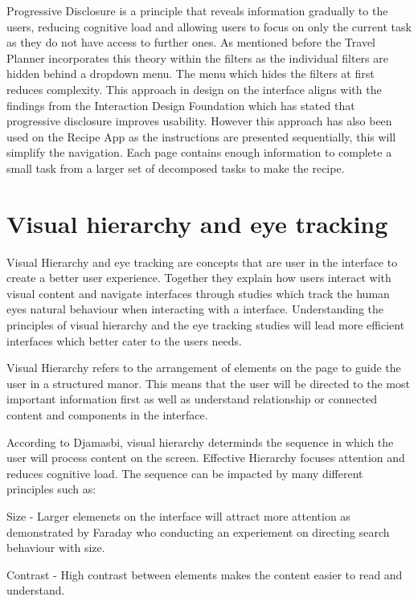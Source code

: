 \documentclass[]{project_interim}
\begin{document}
Progressive Disclosure is a principle that reveals information gradually to the users, reducing cognitive load and allowing users to focus on only the current task as they do not have access to further ones. As mentioned before the Travel Planner incorporates this theory within the filters as the individual filters are hidden behind a dropdown menu. The menu which hides the filters at first reduces complexity. This approach in design on the interface aligns with the findings from the Interaction Design Foundation which has stated that progressive disclosure improves usability. However this approach has also been used on the Recipe App as the instructions are presented sequentially, this will simplify the navigation. Each page contains enough information to complete a small task from a larger set of decomposed tasks to make the recipe.\cite{noauthor_progressive_nodate}

\section{Visual hierarchy and eye tracking}

Visual Hierarchy and eye tracking are concepts that are user in the interface to create a better user experience. Together they explain how users interact with visual content and navigate interfaces through studies which track the human eyes natural behaviour when interacting with a interface. Understanding the principles of visual hierarchy and the eye tracking studies will lead more efficient interfaces which better cater to the users needs.\cite{wang_eye-tracking_2014}

Visual Hierarchy refers to the arrangement of elements on the page to guide the user in a structured manor. This means that the user will be directed to the most important information first as well as understand relationship or connected content and components in the interface.\cite{noauthor_what_nodate}\cite{noauthor_visual_nodate}

According to Djamasbi, visual hierarchy determinds the sequence in which the user will process content on the screen. Effective Hierarchy focuses attention and reduces cognitive load. The sequence can be impacted by many different principles such as:

Size - Larger elemenets on the interface will attract more attention as demonstrated by Faraday who conducting an experiement on directing search behaviour with size.

Contrast - High contrast between elements makes the content easier to read and understand.
\end{document}
